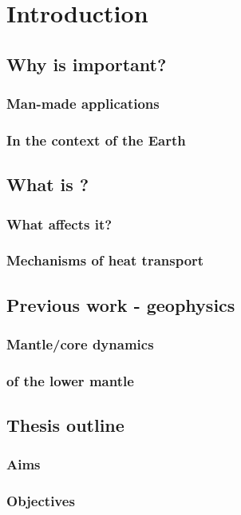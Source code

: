 
\chapter{Introduction} %

\label{Chapter1} %


\section{Why is \tcs important?}

\subsection{Man-made applications}

\subsection{In the context of the Earth}


\section{What is \tc?}

\subsection{What affects it?}

\subsection{Mechanisms of heat transport}


\section{Previous work - geophysics}

\subsection{Mantle/core dynamics}

\subsection{\Tc of the lower mantle}


\section{Thesis outline}

\subsection{Aims}

\subsection{Objectives}